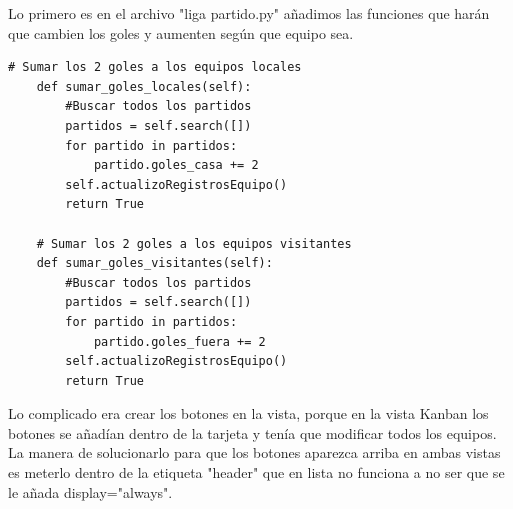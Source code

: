\documentclass[a4paper,12pt]{article}
\begin{document}
Lo primero es en el archivo "liga partido.py" añadimos las funciones que harán que cambien los goles y aumenten según que equipo sea.

\vspace{0.5cm}
\begin{lstlisting}[style=javascript]
    # Sumar los 2 goles a los equipos locales
    def sumar_goles_locales(self):
        #Buscar todos los partidos
        partidos = self.search([])
        for partido in partidos:
            partido.goles_casa += 2
        self.actualizoRegistrosEquipo()
        return True
    
    # Sumar los 2 goles a los equipos visitantes
    def sumar_goles_visitantes(self):
        #Buscar todos los partidos
        partidos = self.search([])
        for partido in partidos:
            partido.goles_fuera += 2
        self.actualizoRegistrosEquipo()
        return True

\end{lstlisting}

Lo complicado era crear los botones en la vista, porque en la vista Kanban los botones se añadían dentro de la tarjeta y tenía que modificar todos los equipos. 
La manera de solucionarlo para que los botones aparezca arriba en ambas vistas es meterlo dentro de la etiqueta "header" que en lista no funciona a no ser que se le añada display="always".
\end{document}
